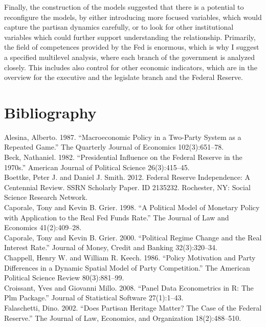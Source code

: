 \documentclass[11pt]{article}
\begin{document}
	Finally, the construction of the models suggested that there is a potential to reconfigure the models, by either introducing more focused variables, which would capture the partisan dynamics carefully, or to look for other institutional variables which could further support understanding the relationship. Primarily, the field of competences provided by the Fed is enormous, which is why I suggest a specified multilevel analysis, where each branch of the government is analyzed closely. This includes also control for other economic indicators, which are in the overview for the executive and the legislate branch and the Federal Reserve.

\section{Bibliography}

Alesina, Alberto. 1987. “Macroeconomic Policy in a Two-Party System as a Repeated Game.” The Quarterly Journal of Economics 102(3):651–78. \\


Beck, Nathaniel. 1982. “Presidential Influence on the Federal Reserve in the 1970s.” American Journal of Political Science 26(3):415–45. \\


Boettke, Peter J. and Daniel J. Smith. 2012. Federal Reserve Independence: A Centennial Review. SSRN Scholarly Paper. ID 2135232. Rochester, NY: Social Science Research Network. \\


Caporale, Tony and Kevin B. Grier. 1998. “A Political Model of Monetary Policy with Application to the Real Fed Funds Rate.” The Journal of Law and Economics 41(2):409–28. \\


Caporale, Tony and Kevin B. Grier. 2000. “Political Regime Change and the Real Interest Rate.” Journal of Money, Credit and Banking 32(3):320–34. \\


Chappell, Henry W. and William R. Keech. 1986. “Policy Motivation and Party Differences in a Dynamic Spatial Model of Party Competition.” The American Political Science Review 80(3):881–99. \\


Croissant, Yves and Giovanni Millo. 2008. “Panel Data Econometrics in R: The Plm Package.” Journal of Statistical Software 27(1):1–43. \\


Falaschetti, Dino. 2002. “Does Partisan Heritage Matter? The Case of the Federal Reserve.” The Journal of Law, Economics, and Organization 18(2):488–510. \\
\end{document}
